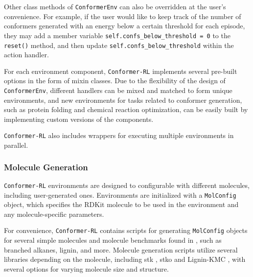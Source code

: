 \documentclass[twoside,11pt]{article}
\newcommand{\code}[1]{\texttt{#1}}
\newcommand{\titleofpaper}{Conformer-RL}
\newcommand{\genComment}[2]{\ifnum\comments=1{\color{#1}{\textsf{\footnotesize #2}}}\fi}
\newcommand{\tarun}[1] {\genComment{blue}{[TG: #1]}}
\newcommand{\josh}[1]{\genComment{purple}{[JK:#1]}}
\begin{document}
\begin{itemize}
\end{itemize}
Other class methods of \code{ConformerEnv} can also be overridden at the user's convenience. For example, if the user would like to keep track of the number of conformers generated with an energy below a certain threshold for each episode, they may add a member variable \code{self.confs\_below\_threshold = 0} to the \code{reset()} method, and then update \code{self.confs\_below\_threshold} within the action handler.

For each environment component, \code{\titleofpaper} implements several pre-built options in the form of mixin classes. Due to the flexibility of the design of \code{ConformerEnv}, different handlers can be mixed and matched to form unique environments, and new environments for tasks related to conformer generation, such as protein folding and chemical reaction optimization, can be easily built by implementing custom versions of the components.

\code{\titleofpaper} also includes wrappers for executing multiple environments in parallel. 

  \subsubsection{Molecule Generation}
  \code{\titleofpaper} environments are designed to configurable with different molecules, including user-generated ones. Environments are initialized with a \code{MolConfig} object, which specifies the RDKit molecule to be used in the environment and any molecule-specific parameters.

  For convenience, \code{\titleofpaper} contains scripts for generating \code{MolConfig} objects for several simple molecules and molecule benchmarks found in \citet{gogineni2020torsionnet}, such as branched alkanes, lignin, and more. Molecule generation scripts utilize several libraries depending on the molecule, including stk \citep{Turcani2021stk}, stko \citep{Tarzia2021stko} and Lignin-KMC \citep{Orella2019ligninkmc}, with several options for varying molecule size and structure.
  
\end{document}
